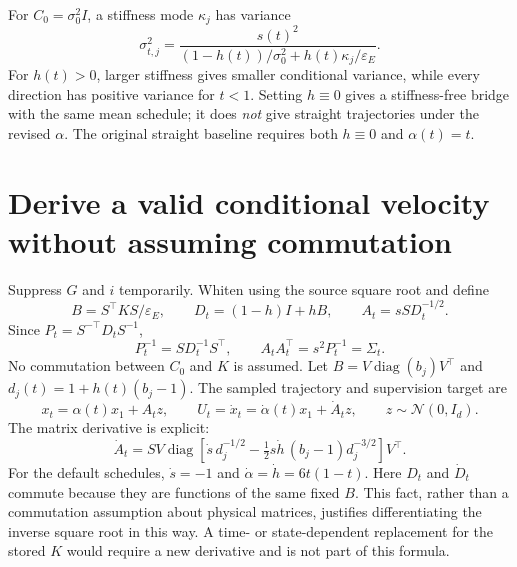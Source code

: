 \documentclass[11pt,letterpaper]{article}
\newcommand{\epsE}{\varepsilon_E}
\newcommand{\diag}{\operatorname{diag}}
\begin{document}
For $C_0=\sigma_0^2I$, a stiffness mode $\kappa_j$ has variance
\begin{equation}\label{eq:modevariance}
\sigma_{t,j}^2=
\frac{s(t)^2}{(1-h(t))/\sigma_0^2+h(t)\kappa_j/\epsE}.
\end{equation}
For $h(t)>0$, larger stiffness gives smaller conditional variance, while every direction has positive variance for $t<1$. Setting $h\equiv0$ gives a stiffness-free bridge with the same mean schedule; it does \emph{not} give straight trajectories under the revised $\alpha$. The original straight baseline requires both $h\equiv0$ and $\alpha(t)=t$.

\section{Derive a valid conditional velocity without assuming commutation}\label{sec:velocity}

Suppress $G$ and $i$ temporarily. Whiten using the source square root and define
\begin{equation}\label{eq:factor}
B=S^\top KS/\epsE,\qquad D_t=(1-h)I+hB,\qquad A_t=sSD_t^{-1/2}.
\end{equation}
Since $P_t=S^{-\top}D_tS^{-1}$,
\begin{equation}\label{eq:factorproof}
P_t^{-1}=SD_t^{-1}S^\top,\qquad A_tA_t^\top=s^2P_t^{-1}=\Sigma_t.
\end{equation}
No commutation between $C_0$ and $K$ is assumed. Let $B=V\diag(b_j)V^\top$ and $d_j(t)=1+h(t)(b_j-1)$. The sampled trajectory and supervision target are
\begin{equation}\label{eq:trajectory}
\boxed{\ x_t=\alpha(t)x_1+A_tz,\qquad
U_t=\dot x_t=\dot\alpha(t)x_1+\dot A_tz,\qquad z\sim\mathcal N(0,I_d).\ }
\end{equation}
The matrix derivative is explicit:
\begin{equation}\label{eq:adot}
\dot A_t=SV\diag\!\left[
\dot s\,d_j^{-1/2}-\tfrac12s\dot h\,(b_j-1)d_j^{-3/2}
\right]V^\top.
\end{equation}
For the default schedules, $\dot s=-1$ and $\dot\alpha=\dot h=6t(1-t)$. Here $D_t$ and $\dot D_t$ commute because they are functions of the same fixed $B$. This fact, rather than a commutation assumption about physical matrices, justifies differentiating the inverse square root in this way. A time- or state-dependent replacement for the stored $K$ would require a new derivative and is not part of this formula.
\end{document}
